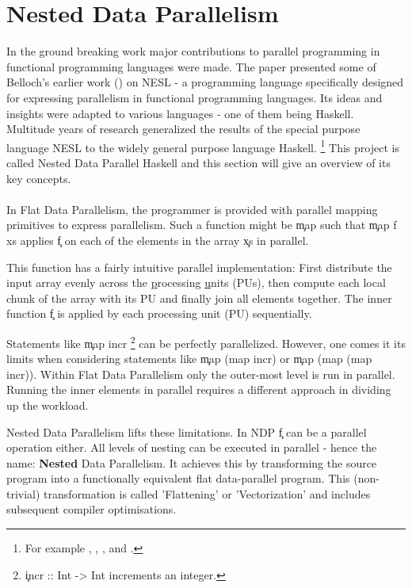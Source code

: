 \section{Nested Data Parallelism}
  \label{section:ndpintro}
  
  In the ground breaking work \cite{Belloch1996}
  major contributions to parallel programming in
  functional programming languages were made.
  The paper presented some of Belloch's earlier work (\cite{NepaBelloch1993}) on NESL
  - a programming language specifically designed for expressing parallelism
  in functional programming languages. Its ideas and insights were
  adapted to various languages - one of them being Haskell.
  Multitude years of research generalized the
  results of the special purpose language NESL
  to the widely general purpose language Haskell.
  \footnote{For example \cite{Harness2008}, \cite{DPHStatus2007},
  \cite{EffiVect2012Lipp}, \cite{HighOrdFlat2006} and \cite{DistTypes1999}.}
  This project is called Nested Data Parallel Haskell and this section will give
  an overview of its key concepts.
  
  \paragraph{}
    In Flat Data Parallelism, the programmer is provided with parallel mapping primitives
    to express parallelism. Such a function might be \c{map} such that \c{map f xs} applies \c{f}
    on each of the elements in the array \c{xs} in parallel.
    
    This function has a fairly intuitive parallel implementation:
    First distribute the input array evenly across the \underline{p}rocessing \underline{u}nits (PUs),
    then compute each local chunk of the array with its PU and finally join all elements together.
    The inner function \c{f} is applied by each processing unit (PU) sequentially.
    
    Statements like \c{map incr}
    \footnote{\c{incr :: Int -> Int} increments an integer.}
    can be perfectly parallelized.
    However, one comes it its limits when considering statements like \c{map (map incr)} or \c{map (map (map incr))}.
    Within Flat Data Parallelism only the outer-most level is run in parallel.
    Running the inner elements in parallel requires a different approach in dividing up the workload.
    
    \p
    Nested Data Parallelism lifts these limitations.
    In NDP \c{f} can be a parallel operation either. All levels of nesting can
    be executed in parallel - hence the name: \textbf{Nested} Data Parallelism.
    It achieves this by transforming the source program into a functionally
    equivalent flat data-parallel program. This (non-trivial) transformation
    is called 'Flattening' or 'Vectorization' and includes subsequent compiler optimisations.
    

